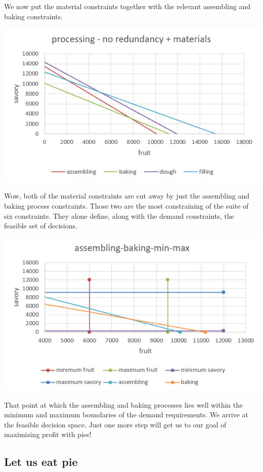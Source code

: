 \documentclass[
]{book}
\begin{document}
We now put the material constraints together with the relevant assembling and baking constraints.

\includegraphics{images/03/pie-2-product-material-no-redundancy-process.jpg}

Wow, both of the material constraints are cut away by just the assembling and baking process constraints. Those two are the most constraining of the suite of six constraints. They alone define, along with the demand constraints, the feasible set of decisions.

\includegraphics{images/03/pie-2-product-aassembing-baking-minmax.jpg}

That point at which the assembling and baking processes lies well within the minimum and maximum boundaries of the demand requirements. We arrive at the feasible decision space. Just one more step will get us to our goal of maximizing profit with pies!

\hypertarget{let-us-eat-pie}{%
\subsection{Let us eat pie}\label{let-us-eat-pie}}
\end{document}
